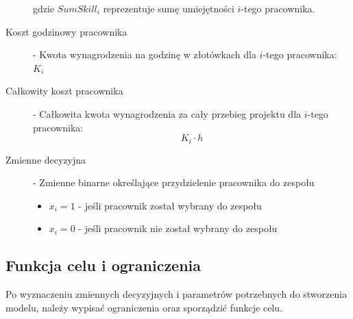 \begin{description}
        gdzie \(SumSkill_{i}\) reprezentuje sumę umiejętności \(i\)-tego pracownika.
        
        \item[Koszt godzinowy pracownika] - Kwota wynagrodzenia na godzinę w złotówkach dla \(i\)-tego pracownika: \(K_{i}\)

        \item[Całkowity koszt pracownika] - Całkowita kwota wynagrodzenia za cały przebieg projektu dla \(i\)-tego pracownika: 
            \[
                K_{i} \cdot h
            \]

        \item[Zmienne decyzyjna] - Zmienne binarne określające przydzielenie pracownika do zespołu
            {\begin{itemize}
                \item $x_{i} = 1$ - jeśli pracownik został wybrany do zespołu
                \item $x_{i} = 0$ - jeśli pracownik nie został wybrany do zespołu
            \end{itemize}}
    \end{description}
    
    \subsection{Funkcja celu i ograniczenia}
    \par Po wyznaczeniu zmiennych decyzyjnych i parametrów potrzebnych do stworzenia modelu, należy wypisać ograniczenia oraz sporządzić funkcje celu. 


